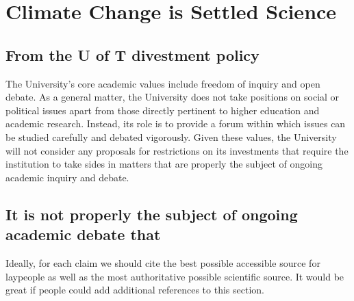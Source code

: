 
		\section{Climate Change is Settled Science}


	
	\subsection{From the U of T divestment policy}


\begin{itquote}	
The University's core academic values include freedom of inquiry and open debate.
As a general matter, the University does not take positions on social or political issues apart from those directly pertinent to higher education and academic research. 
Instead, its role is to provide a forum within which issues can be studied carefully and debated vigorously. 
Given these values, the University will not consider any proposals for restrictions on its investments that require the institution to take sides in matters that are properly the subject of ongoing academic inquiry and debate.
\end{itquote}



	\subsection{It is not properly the subject of ongoing academic debate that}


\begin{vcom}
Ideally, for each claim we should cite the best possible accessible source for laypeople as well as the most authoritative possible scientific source. It would be great if people could add additional references to this section.
\end{vcom}

